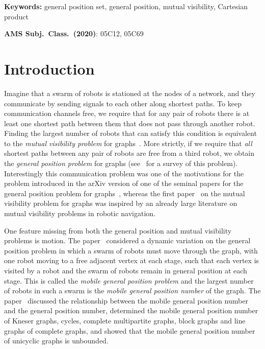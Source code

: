 \documentclass[a4paper,12pt]{article}
\theoremstyle{definition}
\begin{document}
	\noindent
	{\bf Keywords:}
	general position set, general position, mutual visibility, Cartesian product
	
	\medskip\noindent
	{\bf AMS Subj.\ Class.\ (2020)}: 05C12, 05C69
	
	\section{Introduction}
	
	Imagine that a swarm of robots is stationed at the nodes of a network, and they communicate by sending signals to each other along shortest paths. To keep communication channels free, we require that for any pair of robots there is at least one shortest path between them that does not pass through another robot. Finding the largest number of robots that can satisfy this condition is equivalent to the \emph{mutual visibility problem} for graphs~\cite{DiStefano}. More strictly, if we require that \emph{all} shortest paths between any pair of robots are free from a third robot, we obtain the \emph{general position problem} for graphs (see~\cite{survey} for a survey of this problem). Interestingly this communication problem was one of the motivations for the problem introduced in the arXiv version of one of the seminal papers for the general position problem for graphs~\cite{manuel-2017arxiv}, whereas the first paper~\cite{DiStefano} on the mutual visibility problem for graphs was inspired by an already large literature on mutual visibility problems in robotic navigation.
	
	One feature missing from both the general position and mutual visibility problems is motion. The paper~\cite{klavzar-2023} considered a dynamic variation on the general position problem in which a swarm of robots must move through the graph, with one robot moving to a free adjacent vertex at each stage, such that each vertex is visited by a robot and the swarm of robots remain in general position at each stage. This is called the \emph{mobile general position problem} and the largest number of robots in such a swarm is the \emph{mobile general position number} of the graph. The paper~\cite{klavzar-2023} discussed the relationship between the mobile general position number and the general position number, determined the mobile general position number of Kneser graphs, cycles, complete multipartite graphs, block graphs and line graphs of complete graphs, and showed that the mobile general position number of unicyclic graphs is unbounded. 
	
\end{document}
